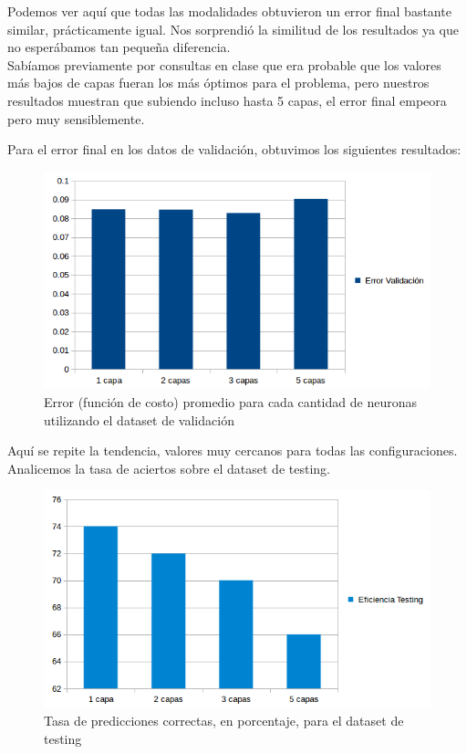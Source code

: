 Podemos ver aquí que todas las modalidades obtuvieron un error final bastante similar, prácticamente igual. Nos sorprendió la similitud de los resultados ya que no esperábamos tan pequeña diferencia.\\
Sabíamos previamente por consultas en clase que era probable que los valores más bajos de capas fueran los más óptimos para el problema, pero nuestros resultados muestran que subiendo incluso hasta 5 capas, el error final empeora pero muy sensiblemente.

Para el error final en los datos de validación, obtuvimos los siguientes resultados:\\

\begin{figure}[h]
  \begin{center}
  \includegraphics[scale=0.75]{graficos/ej2_cant_capas_error_valid.png}
  \caption{Error (función de costo) promedio para cada cantidad de neuronas utilizando el dataset de validación}
  \end{center}
\end{figure}

\newpage

Aquí se repite la tendencia, valores muy cercanos para todas las configuraciones.\\

Analicemos la tasa de aciertos sobre el dataset de testing.

\begin{figure}[h]
  \begin{center}
  \includegraphics[scale=0.75]{graficos/ej2_cant_capas_testing.png}
  \caption{Tasa de predicciones correctas, en porcentaje, para el dataset de testing}
  \end{center}
\end{figure}

